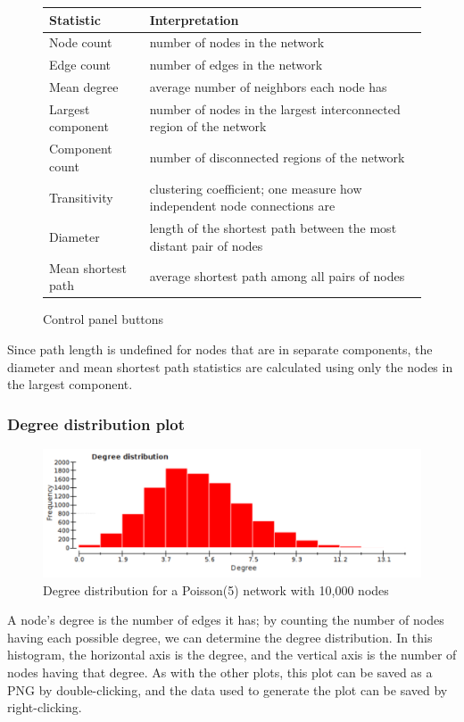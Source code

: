 \documentclass{article}
\begin{document}
\UndefineShortVerb{\|}
\begin{figure}[h]
\begin{center}
\begin{tabular}{|l|l|}
\hline
Statistic & Interpretation \\ \hline
Node count & number of nodes in the network\\ 
Edge count & number of edges in the network\\ 
Mean degree & average number of neighbors each node has\\ 
Largest component & number of nodes in the largest interconnected region of the network\\ 
Component count & number of disconnected regions of the network\\ 
Transitivity & clustering coefficient; one measure how independent node connections are\\ 
Diameter & length of the shortest path between the most distant pair of nodes\\
Mean shortest path & average shortest path among all pairs of nodes\\
\hline
\end{tabular}
\caption{Control panel buttons}
\end{center}
\end{figure}
\DefineShortVerb{\|}

Since path length is undefined for nodes that are in separate components, the diameter and mean shortest path statistics are calculated using only the nodes in the largest component.

\subsubsection{Degree distribution plot}
\begin{figure}[h]
\begin{center}
\includegraphics[width = 6in]{deg_example.pdf}
\caption{Degree distribution for a Poisson(5) network with 10,000 nodes}
\end{center}
\end{figure}
A node's degree is the number of edges it has; by counting the number of nodes having each possible degree, we can determine the degree distribution.  In this histogram, the horizontal axis is the degree, and the vertical axis is the number of nodes having that degree.  As with the other plots, this plot can be saved as a PNG by double-clicking, and the data used to generate the plot can be saved by right-clicking.
\end{document}
